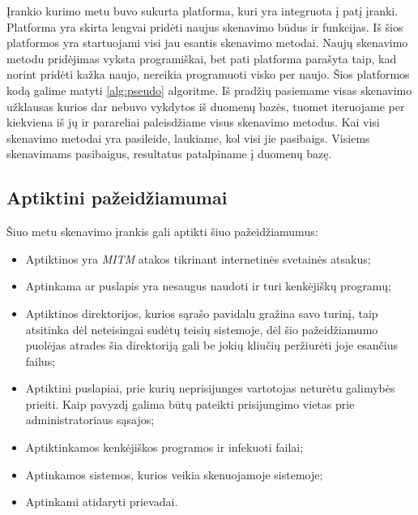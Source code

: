 \documentclass[a4paper,12pt,fleqn]{article}
\begin{document}
Įrankio kurimo metu buvo sukurta platforma, kuri yra integruota į patį įranki. Platforma yra skirta lengvai pridėti naujus skenavimo būdus ir funkcijas. Iš šios platformos yra startuojami visi jau esantis skenavimo metodai. Naujų skenavimo metodu pridėjimas vyksta programiškai, bet pati platforma parašyta taip, kad norint pridėti kažka naujo, nereikia programuoti visko per naujo. Šios platformos kodą galime matyti \ref{alg:pseudo} algoritme. Iš pradžių pasiemame visas skenavimo užklausas kurios dar nebuvo vykdytos iš duomenų bazės, tuomet iteruojame per kiekviena iš jų ir parareliai paleisdžiame visus skenavimo metodus. Kai visi skenavimo metodai yra pasileide, laukiame, kol visi jie pasibaigs. Visiems skenavimams pasibaigus, resultatus patalpiname į duomenų bazę.


\subsection{Aptiktini pažeidžiamumai}

Šiuo metu skenavimo įrankis gali aptikti šiuo pažeidžiamumus:
\begin{itemize}
	\item Aptiktinos yra \textit{MITM} atakos tikrinant internetinės svetainės atsakus;
	\item Aptinkama ar puslapis yra nesaugus naudoti ir turi kenkėjiškų programų;
	\item Aptiktinos direktorijos, kurios sąrašo pavidalu gražina savo turinį, taip atsitinka dėl neteisingai sudėtų teisių sistemoje, dėl šio pažeidžiamumo puolėjas atrades šia direktoriją gali be jokių kliučių peržiurėti joje esančius failus;
	\item Aptiktini puslapiai, prie kurių neprisijunges vartotojas neturėtu galimybės prieiti. Kaip pavyzdį galima būtų pateikti prisijungimo vietas prie administratoriaus sąsajos;
	\item Aptiktinkamos kenkėjiškos programos ir infekuoti failai;
	\item Aptinkamos sistemos, kurios veikia skenuojamoje sistemoje;
	\item Aptinkami atidaryti prievadai.
\end{itemize}
\end{document}
